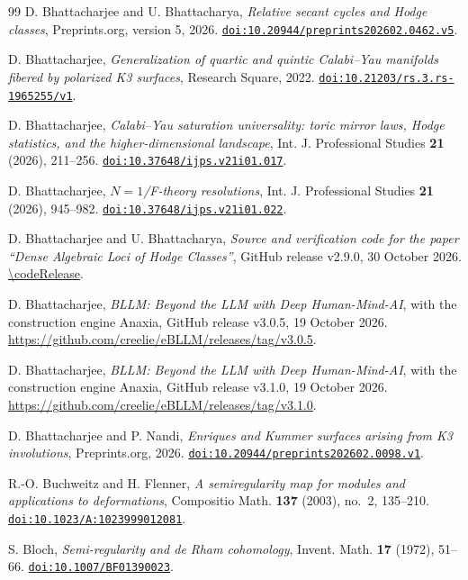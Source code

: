 \begin{thebibliography}{99}
D. Bhattacharjee and U. Bhattacharya,
\emph{Relative secant cycles and Hodge classes},
Preprints.org, version 5, 2026.
\href{https://doi.org/10.20944/preprints202602.0462.v5}{\nolinkurl{doi:10.20944/preprints202602.0462.v5}}.

D. Bhattacharjee,
\emph{Generalization of quartic and quintic Calabi--Yau manifolds fibered by polarized K3 surfaces},
Research Square, 2022.
\href{https://doi.org/10.21203/rs.3.rs-1965255/v1}{\nolinkurl{doi:10.21203/rs.3.rs-1965255/v1}}.

D. Bhattacharjee,
\emph{Calabi--Yau saturation universality: toric mirror laws, Hodge statistics, and the higher-dimensional landscape},
Int. J. Professional Studies \textbf{21} (2026), 211--256.
\href{https://doi.org/10.37648/ijps.v21i01.017}{\nolinkurl{doi:10.37648/ijps.v21i01.017}}.

D. Bhattacharjee,
\emph{$N=1$/F-theory resolutions},
Int. J. Professional Studies \textbf{21} (2026), 945--982.
\href{https://doi.org/10.37648/ijps.v21i01.022}{\nolinkurl{doi:10.37648/ijps.v21i01.022}}.

D. Bhattacharjee and U. Bhattacharya,
\emph{Source and verification code for the paper ``Dense Algebraic Loci of Hodge Classes''},
GitHub release v2.9.0, 30 October 2026.
\url{\codeRelease}.

D. Bhattacharjee,
\emph{BLLM: Beyond the LLM with Deep Human-Mind-AI}, with the construction engine Anaxia,
GitHub release v3.0.5, 19 October 2026.
\url{https://github.com/creelie/eBLLM/releases/tag/v3.0.5}.

D. Bhattacharjee,
\emph{BLLM: Beyond the LLM with Deep Human-Mind-AI}, with the construction engine Anaxia,
GitHub release v3.1.0, 19 October 2026.
\url{https://github.com/creelie/eBLLM/releases/tag/v3.1.0}.

D. Bhattacharjee and P. Nandi,
\emph{Enriques and Kummer surfaces arising from K3 involutions},
Preprints.org, 2026.
\href{https://doi.org/10.20944/preprints202602.0098.v1}{\nolinkurl{doi:10.20944/preprints202602.0098.v1}}.

R.-O. Buchweitz and H. Flenner,
\emph{A semiregularity map for modules and applications to deformations},
Compositio Math. \textbf{137} (2003), no.~2, 135--210.
\href{https://doi.org/10.1023/A:1023999012081}{\nolinkurl{doi:10.1023/A:1023999012081}}.

S. Bloch,
\emph{Semi-regularity and de Rham cohomology},
Invent. Math. \textbf{17} (1972), 51--66.
\href{https://doi.org/10.1007/BF01390023}{\nolinkurl{doi:10.1007/BF01390023}}.


\end{thebibliography}
